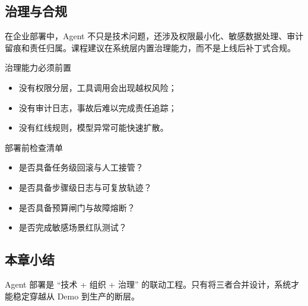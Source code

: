 \subsection{治理与合规}
在企业部署中，Agent 不只是技术问题，还涉及权限最小化、敏感数据处理、审计留痕和责任归属。课程建议在系统层内置治理能力，而不是上线后补丁式合规。

\begin{warningbox}{治理能力必须前置}
\begin{itemize}
    \item 没有权限分层，工具调用会出现越权风险；
    \item 没有审计日志，事故后难以完成责任追踪；
    \item 没有红线规则，模型异常可能快速扩散。
\end{itemize}
\end{warningbox}

\begin{knowledgebox}{部署前检查清单}
\begin{itemize}
    \item 是否具备任务级回滚与人工接管？
    \item 是否具备步骤级日志与可复放轨迹？
    \item 是否具备预算闸门与故障熔断？
    \item 是否完成敏感场景红队测试？
\end{itemize}
\end{knowledgebox}

\subsection{本章小结}
Agent 部署是 ``技术 + 组织 + 治理'' 的联动工程。只有将三者合并设计，系统才能稳定穿越从 Demo 到生产的断层。

